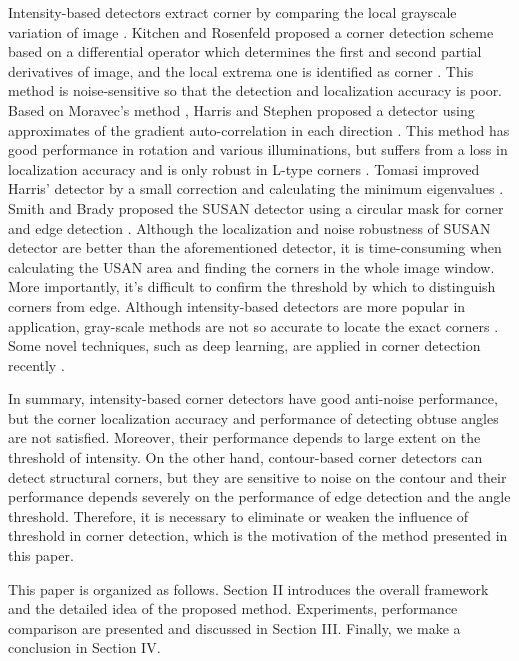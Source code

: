 \documentclass[letterpaper, 10 pt, conference]{ieeeconf}  %
\begin{document}
Intensity-based detectors extract corner by comparing the local grayscale variation of image \cite{Kahaki2014Contour}. Kitchen and Rosenfeld proposed a corner detection scheme based on a differential operator which determines the first and second partial derivatives of image, and the local extrema one is identified as corner \cite{Kitchen1982Gray}. This method is noise-sensitive so that the detection and localization accuracy is poor. Based on Moravec's method \cite{Morevec1977Towards}, Harris and Stephen proposed a detector using approximates of the gradient auto-correlation in each direction \cite{Harris1988A}. This method has good performance in rotation and various illuminations, but suffers from a loss in localization accuracy and is only robust in L-type corners \cite{Noble1988Finding}. Tomasi improved Harris' detector by a small correction and calculating the minimum eigenvalues \cite{Shi1993Good}. Smith and Brady proposed the SUSAN detector using a circular mask for corner and edge detection \cite{Smith1997SUSAN}. Although the localization and noise robustness of SUSAN detector are better than the aforementioned detector, it is time-consuming when calculating the USAN area and finding the corners in the whole image window. More importantly, it's difficult to confirm the threshold by which to distinguish corners from edge. Although intensity-based detectors are more popular in application, gray-scale methods are not so accurate to locate the exact corners \cite{Kahaki2014Contour}. Some novel techniques, such as deep learning, are applied in corner detection recently \cite{lei2004cnn}\cite{Dong2018Corner}.

In summary, intensity-based corner detectors have good anti-noise performance, but the corner localization accuracy and performance of detecting obtuse angles are not satisfied. Moreover, their performance depends to large extent on the threshold of intensity. On the other hand, contour-based corner detectors can detect structural corners, but they are sensitive to noise on the contour and their performance depends severely on the performance of edge detection and the angle threshold. Therefore, it is necessary to eliminate or weaken the influence of threshold in corner detection, which is the motivation of the method presented in this paper. 

This paper is organized as follows. Section II introduces the overall framework and the detailed idea of the proposed method. Experiments, performance comparison are presented and discussed in Section III. Finally, we make a conclusion in Section IV.
\end{document}
